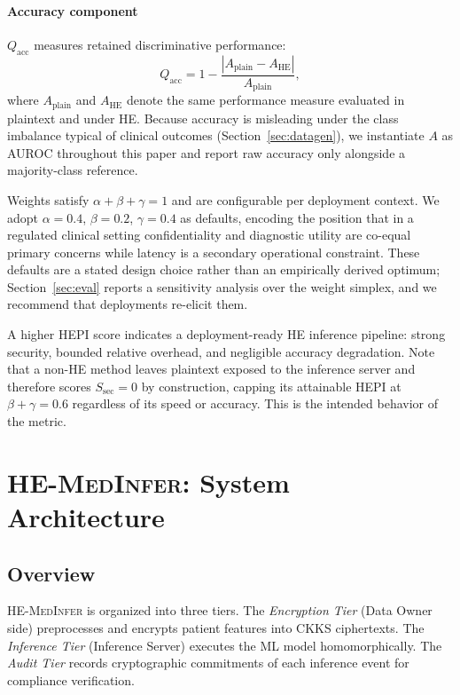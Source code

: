 \documentclass[journal,compsoc]{IEEEtran}
\newcommand{\HEPI}{\textsc{HEPI}}          %
\newcommand{\framework}{\textsc{HE-MedInfer}}
\begin{document}
\paragraph*{Accuracy component} $Q_{\mathrm{acc}}$ measures retained
discriminative performance:
\begin{equation}
  Q_{\mathrm{acc}} = 1 - \frac{|A_{\mathrm{plain}} - A_{\mathrm{HE}}|}{A_{\mathrm{plain}}},
  \label{eq:qacc}
\end{equation}
where $A_{\mathrm{plain}}$ and $A_{\mathrm{HE}}$ denote the same
performance measure evaluated in plaintext and under HE. Because accuracy is
misleading under the class imbalance typical of clinical outcomes
(Section~\ref{sec:datagen}), we instantiate $A$ as AUROC throughout this paper
and report raw accuracy only alongside a majority-class reference.

Weights satisfy $\alpha + \beta + \gamma = 1$ and are configurable per
deployment context. We adopt $\alpha = 0.4$, $\beta = 0.2$, $\gamma = 0.4$ as
defaults, encoding the position that in a regulated clinical setting
confidentiality and diagnostic utility are co-equal primary concerns while
latency is a secondary operational constraint. These defaults are a stated
design choice rather than an empirically derived optimum; Section~\ref{sec:eval}
reports a sensitivity analysis over the weight simplex, and we recommend that
deployments re-elicit them.

A higher \HEPI{} score indicates a deployment-ready HE inference pipeline:
strong security, bounded relative overhead, and negligible accuracy
degradation. Note that a non-HE method leaves plaintext exposed to the
inference server and therefore scores $S_{\mathrm{sec}} = 0$ by construction,
capping its attainable \HEPI{} at $\beta + \gamma = 0.6$ regardless of its
speed or accuracy. This is the intended behavior of the metric.

\section{\framework{}: System Architecture}
\label{sec:framework}

\subsection{Overview}

\framework{} is organized into three tiers. The \emph{Encryption Tier} (Data
Owner side) preprocesses and encrypts patient features into CKKS ciphertexts.
The \emph{Inference Tier} (Inference Server) executes the ML model homomorphically.
The \emph{Audit Tier} records cryptographic commitments of each inference event
for compliance verification.
\end{document}
